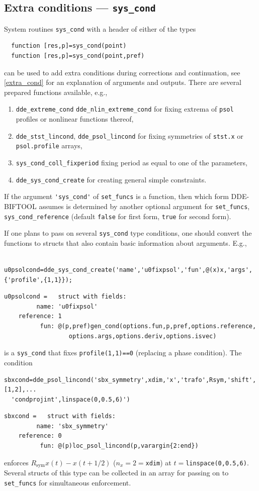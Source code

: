 \documentclass[10pt]{scrartcl}
\newcommand{\DDEBIFCODE}{\textsc{DDE-BIFTOOL}}
\newcommand{\blist}[1]{\mbox{\lstinline!#1!}}
\begin{document}
\subsection{Extra conditions --- \texorpdfstring{\blist{sys_cond}}{sys\_cond}}\label{sec:syscond}
System routines \blist{sys_cond} with a header of either of the types
\begin{lstlisting}
  function [res,p]=sys_cond(point)
  function [res,p]=sys_cond(point,pref)
\end{lstlisting}
can be used to add extra conditions during corrections and
continuation, see \cref{extra_cond} for an explanation of
arguments and outputs. There  are several prepared functions available, e.g.,
\begin{enumerate}
\item \blist{dde_extreme_cond} \blist{dde_nlin_extreme_cond} for
  fixing extrema of \blist{psol} profiles or nonlinear functions
  thereof, 
\item \blist{dde_stst_lincond}, \blist{dde_psol_lincond} for
  fixing symmetries of \blist{stst.x} or \blist{psol.profile} arrays,
\item \blist{sys_cond_coll_fixperiod} fixing period as equal to one of the parameters,
\item \blist{dde_sys_cond_create} for creating general simple constraints.
\end{enumerate}
If the argument \blist{'sys_cond'} of \blist{set_funcs} is a function,
then which form \DDEBIFCODE{} assumes is determined by another
optional argument for \blist{set_funcs}, \blist{sys_cond_reference}
(default \blist{false} for first form, \blist{true} for second form).

If one plans to pass on several \blist{sys_cond} type conditions, one should convert the functions to structs that also contain basic information about arguments. E.g.,
\begin{lstlisting}
  u0psolcond=dde_sys_cond_create('name','u0fixpsol','fun',@(x)x,'args',{'profile',{1,1}});    
\end{lstlisting}
\begin{verbatim}
u0psolcond =   struct with fields:
         name: 'u0fixpsol'
    reference: 1
          fun: @(p,pref)gen_cond(options.fun,p,pref,options.reference,
                  options.args,options.deriv,options.isvec)
\end{verbatim}
is a \blist{sys_cond} that fixes \blist{profile(1,1)==0} (replacing a
phase condition). The condition
\begin{lstlisting}
sbxcond=dde_psol_lincond('sbx_symmetry',xdim,'x','trafo',Rsym,'shift',[1,2],...
  'condprojint',linspace(0,0.5,6)')
\end{lstlisting}
\begin{verbatim}
sbxcond =   struct with fields:
         name: 'sbx_symmetry'
    reference: 0
          fun: @(p)loc_psol_lincond(p,varargin{2:end}) 
\end{verbatim}
enforces $R_\mathrm{sym}x(t)-x(t+1/2)$ ($n_x=2=$\blist{xdim}) at $t=$\blist{linspace(0,0.5,6)}.
Several structs of this type can be collected in an array for passing on to \blist{set_funcs} for simultaneous enforcement.
  
\end{document}
